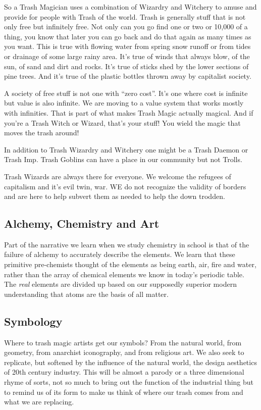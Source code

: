 So a Trash Magician uses a combination of Wizardry and Witchery to amuse
and provide for people with Trash of the world. Trash is generally stuff
that is not only free but infinitely free. Not only can you go find one
or two or 10,000 of a thing, you know that later you can go back and do
that again as many times as you want. This is true with flowing water
from spring snow runoff or from tides or drainage of some large rainy
area. It's true of winds that always blow, of the sun, of sand and dirt
and rocks. It's true of sticks shed by the lower sections of pine trees.
And it's true of the plastic bottles thrown away by capitalist society.

A society of free stuff is not one with ``zero cost''. It's one where
cost is infinite but value is also infinite. We are moving to a value
system that works mostly with infinities. That is part of what makes
Trash Magic actually magical. And if you're a Trash Witch or Wizard,
that's your stuff! You wield the magic that moves the trash around!

In addition to Trash Wizardry and Witchery one might be a Trash Daemon
or Trash Imp. Trash Goblins can have a place in our community but not
Trolls.

Trash Wizards are always there for everyone. We welcome the refugees of
capitalism and it's evil twin, war. WE do not recognize the validity of
borders and are here to help subvert them as needed to help the down
trodden.

\subsection{Alchemy, Chemistry and Art}\label{alchemy-chemistry-and-art}

Part of the narrative we learn when we study chemistry in school is that
of the failure of alchemy to accurately describe the elements. We learn
that these primitive pre-chemists thought of the elements as being
earth, air, fire and water, rather than the array of chemical elements
we know in today's periodic table. The \emph{real} elements are divided
up based on our supposedly superior modern understanding that atoms are
the basis of all matter.

\subsection{Symbology}\label{symbology}

Where to trash magic artists get our symbols? From the natural world,
from geometry, from anarchist iconography, and from religious art. We
also seek to replicate, but softened by the influence of the natural
world, the design aesthetics of 20th century industry. This will be
almost a parody or a three dimensional rhyme of sorts, not so much to
bring out the function of the industrial thing but to remind us of its
form to make us think of where our trash comes from and what we are
replacing.

